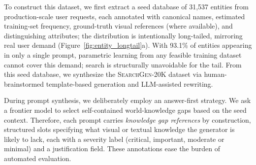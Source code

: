 \documentclass{article}
\newcommand{\dataset}{\textsc{SearchGen-20K}}
\begin{document}
To construct this dataset, we first extract a seed database of 31{,}537 entities from production-scale user requests, each annotated with canonical names, estimated training-set frequency, ground-truth visual references (where available), and distinguishing attributes; the distribution is intentionally long-tailed, mirroring real user demand (Figure~\ref{fig:entity_longtail}a). With 93.1\% of entities appearing in only a single prompt, parametric learning from any feasible training dataset cannot cover this demand; search is structurally unavoidable for the tail.
From this seed database, we synthesize the \dataset{} dataset via human-brainstormed template-based generation and LLM-assisted rewriting.

During prompt synthesis, we deliberately employ an answer-first strategy. We ask a frontier model to select self-contained world-knowledge gaps based on the seed context. Therefore, each prompt carries \emph{knowledge gap references} by construction, structured slots specifying what visual or textual knowledge the generator is likely to lack, each with a severity label (critical, important, moderate or minimal) and a justification field. These annotations ease the burden of automated evaluation.
\end{document}
